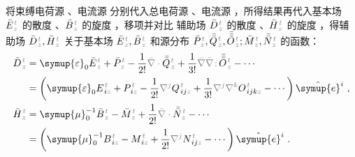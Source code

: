 将束缚电荷源 、电流源  分别代入总电荷源 、电流源 ，所得结果再代入基本场 $\bar{E}^{\;\!\mathcolor{gray}{t}}_{\;\!\mathcolor{gray}{z}}$ 的散度 、$\bar{B}^{\;\!\mathcolor{gray}{t}}_{\;\!\mathcolor{gray}{z}}$ 的旋度 ，移项并对比 辅助场 $\bar{D}^{\;\!\mathcolor{gray}{t}}_{\;\!\mathcolor{gray}{z}}$ 的散度 、$\bar{H}^{\;\!\mathcolor{gray}{t}}_{\;\!\mathcolor{gray}{z}}$ 的旋度 ，得辅助场 $\bar{D}^{\;\!\mathcolor{gray}{t}}_{\;\!\mathcolor{gray}{z}}, \bar{H}^{\;\!\mathcolor{gray}{t}}_{\;\!\mathcolor{gray}{z}}$ 关于基本场 $\bar{E}^{\;\!\mathcolor{gray}{t}}_{\;\!\mathcolor{gray}{z}}, \bar{B}^{\;\!\mathcolor{gray}{t}}_{\;\!\mathcolor{gray}{z}}$ 和源分布 $\bar{P}^{\;\!\mathcolor{gray}{t}}_{\;\!\mathcolor{gray}{z}},\bar{\bar{Q}}^{\;\!\mathcolor{gray}{t}}_{\;\!\mathcolor{gray}{z}},\bar{\bar{\bar{O}}}^{\;\!\mathcolor{gray}{t}}_{\;\!\mathcolor{gray}{z}} ; \bar{M}^{\;\!\mathcolor{gray}{t}}_{\;\!\mathcolor{gray}{z}}, \bar{\bar{N}}^{\;\!\mathcolor{gray}{t}}_{\;\!\mathcolor{gray}{z}}$ 的函数\cite{OriginDependenceMaterial,langeCompletionMultipoleTheory2003,raabTransformedMultipoleTheory2005,grahamMultipoleSolutionMacroscopic2000}：
\begin{subequations}
\begin{align}
	\bar{D}^{\;\!\mathcolor{gray}{t}}_{\;\!\mathcolor{gray}{z}} &= {\symup{\varepsilon}}_0 \bar{E}^{\;\!\mathcolor{gray}{t}}_{\;\!\mathcolor{gray}{z}} + \bar{P}^{\;\!\mathcolor{gray}{t}}_{\;\!\mathcolor{gray}{z}} - \frac{1}{2!} \mathcolor{gray}{\bar{\nabla} \cdot} \bar{\bar{Q}}^{\;\!\mathcolor{gray}{t}}_{\;\!\mathcolor{gray}{z}} + \frac{1}{3!} \mathcolor{gray}{\bar{\nabla}} \mathcolor{gray}{\bar{\nabla} \colon}\! \bar{\bar{\bar{O}}}^{\;\!\mathcolor{gray}{t}}_{\;\!\mathcolor{gray}{z}} - \cdots \label{eq:D} \\
	&= \left( {\symup{\varepsilon}}_0 E^{\;\!\mathcolor{gray}{t}}_{\;\! i\mathcolor{gray}{z}} + P^{\;\!\mathcolor{gray}{t}}_{\;\! i\mathcolor{gray}{z}} - \frac{1}{2!} \mathcolor{gray}{\nabla^j} Q^{\;\!\mathcolor{gray}{t}}_{\;\! ij\mathcolor{gray}{z}} + \frac{1}{3!} \mathcolor{gray}{\nabla^j} \mathcolor{gray}{\nabla^k} O^{\;\!\mathcolor{gray}{t}}_{\;\! ijk\mathcolor{gray}{z}} - \cdots \right) \hat{\symup{e}}^i~, \label{eq:d-pre} \\
	\bar{H}^{\;\!\mathcolor{gray}{t}}_{\;\!\mathcolor{gray}{z}} &= {\symup{\mu}}_0^{-1} \bar{B}^{\;\!\mathcolor{gray}{t}}_{\;\!\mathcolor{gray}{z}} - \bar{M}^{\;\!\mathcolor{gray}{t}}_{\;\!\mathcolor{gray}{z}} + \frac{1}{2!} \mathcolor{gray}{\bar{\nabla} \cdot} \bar{\bar{N}}^{\;\!\mathcolor{gray}{t}}_{\;\!\mathcolor{gray}{z}} - \cdots \label{eq:H} \\
	&= \left( {\symup{\mu}}_0^{-1} B^{\;\!\mathcolor{gray}{t}}_{\;\! i\mathcolor{gray}{z}} - M^{\;\!\mathcolor{gray}{t}}_{\;\! i\mathcolor{gray}{z}} + \frac{1}{2!} \mathcolor{gray}{\nabla^j} N^{\;\!\mathcolor{gray}{t}}_{\;\! ij\mathcolor{gray}{z}} - \cdots \right) \hat{\symup{e}}^i~. \label{eq:h-pre}
\end{align}
\end{subequations}
